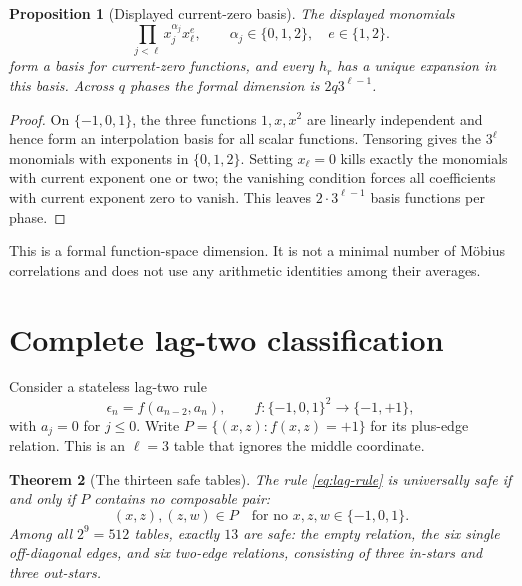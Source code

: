 \documentclass[11pt]{article}
\newtheorem{theorem}{Theorem}[section]
\newtheorem{proposition}[theorem]{Proposition}
\theoremstyle{definition}
\theoremstyle{remark}
\newcommand{\TT}{\{-1,0,1\}}
\newcommand{\SSS}{\{-1,+1\}}
\begin{document}
\begin{proposition}[Displayed current-zero basis]
\label{prop:basis}
The displayed monomials
\begin{equation}
 \prod_{j<\ell}x_j^{\alpha_j}x_\ell^e,\qquad
 \alpha_j\in\{0,1,2\},\quad e\in\{1,2\}.
 \label{eq:basis}
\end{equation}
form a basis for current-zero functions, and every $h_r$ has a unique
expansion in this basis.  Across $q$ phases the formal dimension is
$2q3^{\ell-1}$.
\end{proposition}

\begin{proof}
On $\TT$, the three functions $1,x,x^2$ are linearly independent and hence
form an interpolation basis for all scalar functions.  Tensoring
gives the $3^\ell$ monomials with exponents in $\{0,1,2\}$.  Setting
$x_\ell=0$ kills exactly the monomials with current exponent one or two; the
vanishing condition forces all coefficients with current exponent zero to
vanish.  This leaves $2\cdot3^{\ell-1}$ basis functions per phase.
\end{proof}

This is a formal function-space dimension.  It is not a minimal number of
M\"obius correlations and does not use any arithmetic identities among
their averages.

\section{Complete lag-two classification}

Consider a stateless lag-two rule
\begin{equation}
       \epsilon_n=f(a_{n-2},a_n),\qquad f:\TT^2\to\SSS,
       \label{eq:lag-rule}
\end{equation}
with $a_j=0$ for $j\le0$.  Write
$P=\{(x,z):f(x,z)=+1\}$ for its plus-edge relation.  This is an
$\ell=3$ table that ignores the middle coordinate.

\begin{theorem}[The thirteen safe tables]
\label{thm:thirteen}
The rule \eqref{eq:lag-rule} is universally safe if and only if $P$ contains
no composable pair:
\begin{equation}
       (x,z),(z,w)\in P\quad\text{for no }x,z,w\in\TT.
       \label{eq:no-compose}
\end{equation}
Among all $2^9=512$ tables, exactly $13$ are safe: the empty relation, the
six single off-diagonal edges, and six two-edge relations, consisting of
three in-stars and three out-stars.
\end{theorem}
\end{document}
